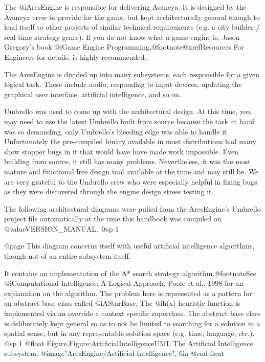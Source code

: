 
The @i{AresEngine} is responsible for delivering Avaneya. It is designed by the Avaneya crew to provide for the game, but kept architecturally general enough to lend itself to other projects of similar technical requirements (e.g. a city builder / real time strategy genre). If you do not know what a game engine is, Jason Gregory's book @i{Game Engine Programming},@footnote{@xref{Resources For Engineers} for details.} is highly recommended.

The AresEngine is divided up into many subsystems, each responsible for a given logical task. These include audio, responding to input devices, updating the graphical user interface, artificial intelligence, and so on.

Umbrello was used to come up with the architectural design. At this time, you may need to use the latest Umbrello built from source because the task at hand was so demanding, only Umbrello's bleeding edge was able to handle it. Unfortunately the pre-compiled binary available in most distributions had many show stopper bugs in it that would have have made work impossible. Even building from source, it still has many problems. Nevertheless, it was the most mature and functional free design tool available at the time and may still be. We are very grateful to the Umbrello crew who were especially helpful in fixing bugs as they were discovered through the engine design stress testing it.

The following architectural diagrams were pulled from the AresEngine's Umbrello project file automatically at the time this handbook was compiled on @value{VERSION_MANUAL}.
@sp 1

@page
This diagram concerns itself with useful artificial intelligence algorithms, though not of an entire subsystem itself.

It contains an implementation of the A* search strategy algorithm.@footnote{See @i{Computational Intelligence: A Logical Approach}, Poole et al., 1998 for an explanation on the algorithm.} The problem here is represented as a pattern for an abstract base class called @i{AStarBase}. The @i{h(x)} heuristic function is implemented via an override a context specific superclass. The abstract base class is deliberately kept general so as to not be limited to searching for a solution in a spatial sense, but in any representable solution space (e.g. time, language, etc.).
@sp 1
@float Figure,Figure:ArtificialIntelligenceUML
The Artificial Intelligence subsystem.
@image{"AresEngine/Artificial Intelligence", 6in}
@end float

